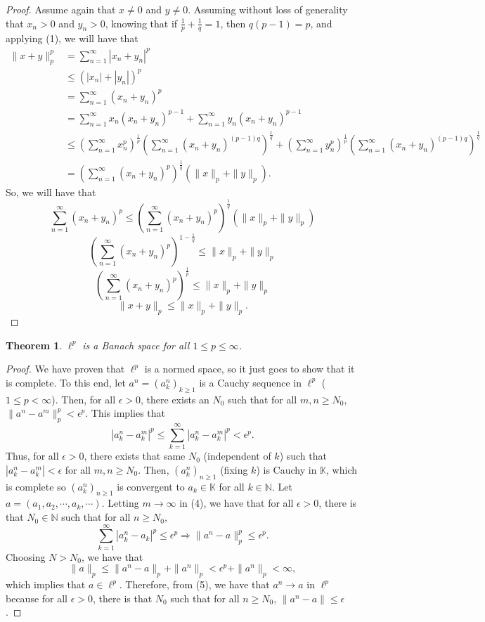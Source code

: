 \documentclass[12pt]{article}
\newtheorem{theorem}{Theorem}
\def\K{\mathbb{K}}
\newcommand{\N}{{\mathbb N}}
\newcommand{\sumi}{\sum\limits_{n = 1}^{\infty}}
\newcommand{\sumk}{\sum\limits_{k = 1}^{\infty}}
\newcommand{\lp}{\left(}
\newcommand{\rp}{\right)}
\newcommand{\vtf}{{\vspace{-25pt}}}
\begin{document}
\begin{proof}
Assume again that $x \neq 0$ and $y \neq 0$. Assuming without loss of generality that $x_n > 0$ and $y_n > 0$, knowing that if $\frac{1}{p} + \frac{1}{q} = 1$, then $q(p - 1) = p$, and applying (1), we will have that
\begin{align*}
\| x + y \|_p^p &  = \sumi |x_n + y_n|^p\\
& \leq \lp |x_n| + |y_n| \rp^p \\
& = \sumi (x_n + y_n)^p \\
& = \sumi x_n( x_n + y_n)^{p-1} + \sumi y_n(x_n + y_n)^{p-1} \\
& \leq \lp \sumi x_n^p \rp^{\frac{1}{p}} \lp \sumi (x_n + y_n)^{(p-1)q} \rp^{\frac{1}{q}} + \lp \sumi y_n^p \rp^{\frac{1}{p}} \lp \sumi (x_n + y_n)^{(p-1)q} \rp^{\frac{1}{q}} \\
& =\lp \sumi (x_n + y_n)^p \rp^{\frac{1}{q}} \lp \| x \|_p + \| y\|_p \rp.
\end{align*}
So, we will have that 
\begin{equation}
\sumi (x_n + y_n)^p \leq \lp \sumi (x_n + y_n)^p \rp^{\frac{1}{q}} \lp \| x \|_p + \| y\|_p \rp
\end{equation}
\[ \lp \sumi (x_n + y_n)^p \rp^{1 - \frac{1}{q}} \leq \|x \|_p + \| y \|_p \]
\[\lp \sumi (x_n + y_n)^p \rp^{\frac{1}{p}} \leq \|x \|_p + \| y \|_p  \]
\[ \| x + y \|_p \leq \| x \|_p + \| y \|_p.\]
\end{proof}
\begin{theorem}
$\ell^p$ is a Banach space for all $1 \leq p \leq \infty$. 
\end{theorem}
\vtf
\begin{proof}
We have proven that $\ell^p$ is a normed space, so it just goes to show that it is complete. To this end, let $a^n = \lp a_k^n \rp_{k \geq 1}$ is a Cauchy sequence in $\ell^p$ ($1 \leq p < \infty$). Then, for all $\epsilon > 0$, there exists an $N_0$ such that for all  $m, n \geq N_0$, $\| a^n  - a^m \|_p^p < \epsilon^p$. This implies that 
\begin{equation}
|a_k^n - a_k^m|^p \leq \sumk |a_k^n - a_k^m|^p < \epsilon^p.
\end{equation}
Thus, for all $\epsilon > 0$, there exists that same $N_0$ (independent of $k$) such that $|a_k^n - a_k^m| < \epsilon$ for all $m, n \geq N_0$. Then, $(a_k^n )_{n \geq 1}$ (fixing $k$) is Cauchy in $\K$, which is complete so $(a_k^n)_{n \geq 1}$ is convergent to $a_k \in \K$ for all $k \in \N$. Let $a = (a_1, a_2, \cdots, a_k ,\cdots)$. Letting $m \to \infty$ in (4), we have that for all $\epsilon >0$, there is that $N_0 \in \N$ such that for all $n \geq N_0$, 
\begin{equation}
\sumk | a_k^n - a_k |^p \leq \epsilon^p \Longrightarrow \| a^n - a \|_p^p \leq \epsilon^p.
\end{equation}
Choosing $N > N_0$, we have that 
\[ \| a \|_p \leq \| a^n - a \|_p + \| a^n \|_p < \epsilon^p + \| a^n \|_p < \infty,\]
which implies that $a \in \ell^p$. Therefore, from (5), we have that $a^n \to a$ in $\ell^p$ because for all $\epsilon > 0$, there is that $N_0$ such that for all $n \geq N_0$, $\| a^n  - a \| \leq \epsilon$. 
\end{proof}
\vtf 
\end{document}
